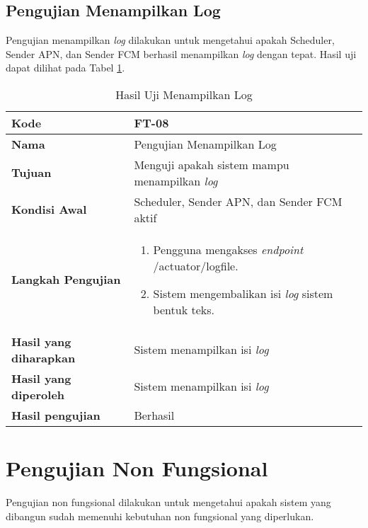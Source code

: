 \subsection{Pengujian Menampilkan Log}
\par Pengujian menampilkan \textit{log} dilakukan untuk mengetahui apakah Scheduler, Sender APN, dan Sender FCM berhasil menampilkan \textit{log} dengan tepat. Hasil uji dapat dilihat pada Tabel \ref{t:uji_menampilkan_log}.
\begin{longtable}{|p{3cm}|p{6.5cm}|}
	\caption{Hasil Uji Menampilkan Log} \label{t:uji_menampilkan_log} \\ \hline
	\textbf{Kode} & FT-08 \\ \hline
	\textbf{Nama} & Pengujian Menampilkan Log \\ \hline
	\textbf{Tujuan} & Menguji apakah sistem mampu menampilkan \textit{log} \\ \hline
	\textbf{Kondisi Awal} & Scheduler, Sender APN, dan Sender FCM aktif \\ \hline
	\textbf{Langkah Pengujian} &  
	\begin{enumerate}
		\item Pengguna mengakses \textit{endpoint} /actuator/logfile.
		\item Sistem mengembalikan isi \textit{log} sistem bentuk teks.
	\end{enumerate} \\ \hline
	\textbf{Hasil yang diharapkan} & Sistem menampilkan isi \textit{log} \\ \hline
	\textbf{Hasil yang diperoleh} & Sistem menampilkan isi \textit{log} \\ \hline
	\textbf{Hasil pengujian} & Berhasil \\ \hline
\end{longtable}

\section{Pengujian Non Fungsional}
\par Pengujian non fungsional dilakukan untuk mengetahui apakah sistem yang dibangun sudah memenuhi kebutuhan non fungsional yang diperlukan.


